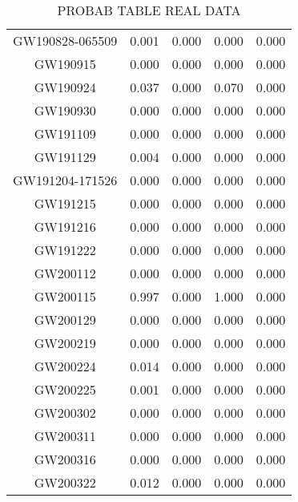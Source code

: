 \begin{table*}[]
\begin{tabular}{c|cc|cc}
GW190828-065509 &  0.001 &	0.000 &	0.000 &	0.000 \\
GW190915 &  0.000 &	0.000 &	0.000 &	0.000 \\
GW190924 &  0.037   &	0.000 & 0.070 &	0.000 \\
GW190930 &	0.000 &	 0.000 &	0.000 &	0.000 \\ 
GW191109 &	0.000 &	0.000 &	0.000 & 0.000 \\
GW191129 & 0.004 & 	0.000 &	0.000 & 0.000 \\
GW191204-171526 & 0.000 &	0.000	& 0.000 &	0.000 \\
GW191215 & 0.000 &	0.000 &	0.000 &	0.000 \\
GW191216 & 0.000 &	0.000 &	0.000 & 0.000 \\
GW191222 & 0.000 &	0.000 &	0.000 & 0.000 \\
GW200112 & 0.000 &	0.000 &	0.000 & 	0.000 \\
GW200115 &	0.997  & 0.000 &	1.000 &	0.000 \\
GW200129 & 0.000 &	0.000 &	0.000 &	0.000 \\
GW200219 & 0.000 &	0.000 &	0.000 	& 0.000 \\
GW200224 & 0.014 &	0.000 &	0.000 & 0.000 \\
GW200225 &  0.001 &	0.000 &	0.000 &	0.000 \\ 
GW200302   & 0.000 &	0.000 &	0.000 & 0.000 \\
GW200311 &	0.000 &	0.000 & 0.000 & 0.000 \\   
GW200316 & 0.000 &	0.000 &	0.000 & 0.000 \\
GW200322 & 0.012 &	0.000 &	0.000 &	0.000 \\


\hline
\end{tabular}
\caption{PROBAB TABLE REAL DATA}
\label{tab:real_data}
\end{table*}
